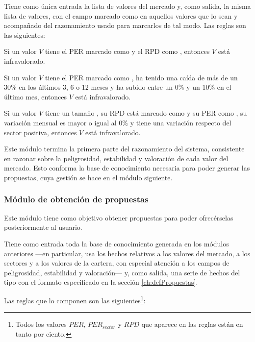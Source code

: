\documentclass[a4paper, 11pt, titlepage]{article}
\begin{document}
    Tiene como única entrada la lista de valores del mercado y, como salida, la misma lista de valores, con el campo  marcado como  en aquellos valores que lo sean y acompañado del razonamiento usado para marcarlos de tal modo. Las reglas son las siguientes:

    \begin{regla}
        Si un valor $V$ tiene el PER marcado como  y el RPD como , entonces $V$ está infravalorado.
    \end{regla}

    \begin{regla}
        Si un valor $V$ tiene el PER marcado como , ha tenido una caída de más de un 30\% en los últimos 3, 6 o 12 meses y ha subido entre un 0\% y un 10\% en el último mes, entonces $V$ está infravalorado.
    \end{regla}

    \begin{regla}
        Si un valor $V$ tiene un tamaño , su RPD está marcado como  y su PER como , su variación mensual es mayor o igual al 0\% y tiene una variación respecto del sector positiva, entonces $V$ está infravalorado.
    \end{regla}

    Este módulo termina la primera parte del razonamiento del sistema, consistente en razonar sobre la peligrosidad, estabilidad y valoración de cada valor del mercado. Esto conforma la base de conocimiento necesaria para poder generar las propuestas, cuya gestión se hace en el módulo siguiente.

    \subsubsection{Módulo de obtención de propuestas}

    Este módulo tiene como objetivo obtener propuestas para poder ofrecérselas posteriormente al usuario.

    Tiene como entrada toda la base de conocimiento generada en los módulos anteriores ---en particular, usa los hechos relativos a los valores del mercado, a los sectores y a los valores de la cartera, con especial atención a los campos de peligrosidad, estabilidad y valoración--- y, como salida, una serie de hechos del tipo  con el formato especificado en la sección \ref{ch:defPropuestas}.

    Las reglas que lo componen son las siguientes\footnote{Todos los valores $PER$, $PER_{sector}$ y $RPD$ que aparece en las reglas están en tanto por ciento.}:
\end{document}
